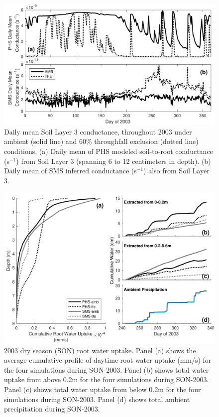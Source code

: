 \documentclass[draft,linenumbers]{agujournal}
\begin{document}
  \clearpage   
  \begin{figure}[h]
     \centering
     \includegraphics[width=30pc]{../figs2/fig6a.pdf}
     \caption{Daily mean Soil Layer 3 conductance, throughout 2003 under ambient (solid line) and 60\% throughfall exclusion (dotted line) conditions.
     (a) Daily mean of PHS modeled soil-to-root conductance (s$^{-1}$) from Soil Layer 3 (spanning 6 to 12 centimeters in depth).
     (b) Daily mean of SMS inferred conductance (s$^{-1}$) also from Soil Layer 3.
     }
     \label{fig:cond2}
  \end{figure}
  
        \clearpage
    \begin{figure}[h]
     \centering
     \includegraphics[width=30pc]{../figs2/fig7.pdf}
     \caption{2003 dry season (SON) root water uptake. 
     Panel (a) shows the average cumulative profile of daytime root water uptake (mm/s) for the four simulations during SON-2003.
     Panel (b) shows total water uptake from above 0.2m for the four simulations during SON-2003.
     Panel (c) shows total water uptake from below 0.2m for the four simulations during SON-2003. 
     Panel (d) shows total ambient precipitation during SON-2003. 
     }
     \label{fig7}
  \end{figure}
  
\end{document}

